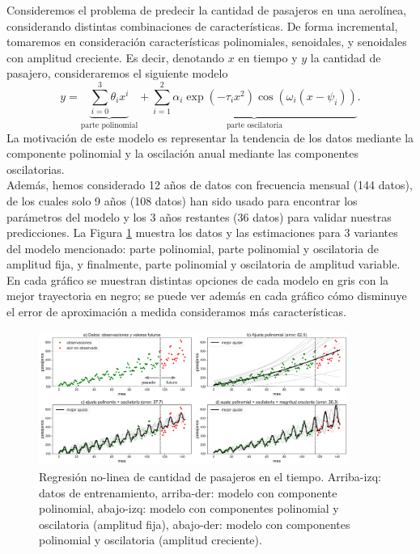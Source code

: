 \begin{mdframed}[style=ejemplo, frametitle={\center Ejemplo: Predicción de pasajeros de una aerolínea)}]

Consideremos el problema de predecir la cantidad de pasajeros en una aerolínea, considerando  distintas combinaciones de características. De forma incremental, tomaremos en consideración características polinomiales,  senoidales, y senoidales con amplitud creciente. Es decir, denotando $x$ en tiempo y $y$  la cantidad de pasajero, consideraremos el siguiente modelo
\begin{equation}
    y = \underbrace{\sum_{i=0}^3 \theta_i x^i}_\text{parte polinomial} + \underbrace{ \sum_{i=1}^2 \alpha_i\exp(-\tau_ix^2)\cos(\omega_i(x-\psi_i))}_\text{parte oscilatoria}.
\end{equation}
La motivación de este modelo es representar la tendencia de los datos mediante la componente polinomial y la oscilación anual mediante las componentes oscilatorias.\\

Además, hemos considerado 12 años de datos con frecuencia mensual (144 datos), de los cuales solo 9 años (108 datos) han sido usado para encontrar los parámetros del modelo y los  3 años restantes (36 datos) para validar nuestras predicciones. La Figura \ref{fig:pasajeros} muestra los datos y las estimaciones para 3 variantes del modelo mencionado: parte polinomial, parte polinomial y oscilatoria de amplitud fija, y finalmente,  parte polinomial y oscilatoria de amplitud variable. En cada gráfico se muestran distintas opciones de cada  modelo en gris con la mejor  trayectoria en negro; se puede ver además en cada gráfico cómo disminuye el error de aproximación a medida consideramos más características. 


\begin{figure}[H]
    \centering
    \includegraphics[width=0.9\textwidth, frame]{img/cap2_pasajeros.pdf}
    \caption{Regresión no-linea de cantidad de pasajeros en el tiempo. Arriba-izq: datos de entrenamiento, arriba-der: modelo con componente polinomial, abajo-izq: modelo con componentes polinomial y oscilatoria (amplitud fija), abajo-der: modelo con componentes polinomial y oscilatoria (amplitud creciente).}
    \label{fig:pasajeros}  
\end{figure}
\end{mdframed}


